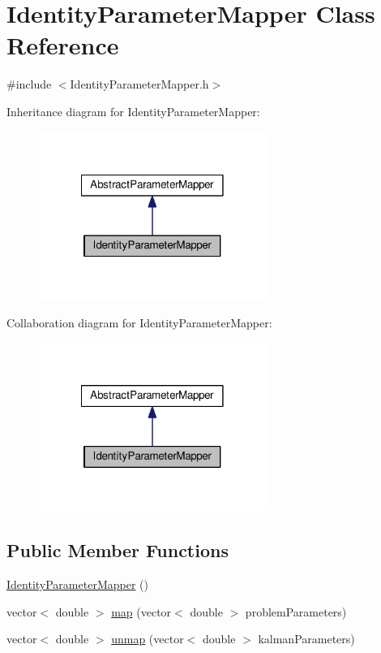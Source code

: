 \hypertarget{classIdentityParameterMapper}{}\section{Identity\+Parameter\+Mapper Class Reference}
\label{classIdentityParameterMapper}


{\ttfamily \#include $<$Identity\+Parameter\+Mapper.\+h$>$}



Inheritance diagram for Identity\+Parameter\+Mapper\+:\nopagebreak
\begin{figure}[H]
\begin{center}
\leavevmode
\includegraphics[width=210pt]{classIdentityParameterMapper__inherit__graph}
\end{center}
\end{figure}


Collaboration diagram for Identity\+Parameter\+Mapper\+:\nopagebreak
\begin{figure}[H]
\begin{center}
\leavevmode
\includegraphics[width=210pt]{classIdentityParameterMapper__coll__graph}
\end{center}
\end{figure}
\subsection*{Public Member Functions}
\begin{DoxyCompactItemize}
\item 
\mbox{\hyperlink{classIdentityParameterMapper_ae09bce8a0343460df2dc251fede4b8ce}{Identity\+Parameter\+Mapper}} ()
\item 
vector$<$ double $>$ \mbox{\hyperlink{classIdentityParameterMapper_a21105fcfd2e89ac5529f97433f03b1c3}{map}} (vector$<$ double $>$ problem\+Parameters)
\item 
vector$<$ double $>$ \mbox{\hyperlink{classIdentityParameterMapper_ad7ad11e683701104024a553eb8f2373b}{unmap}} (vector$<$ double $>$ kalman\+Parameters)
\end{DoxyCompactItemize}


